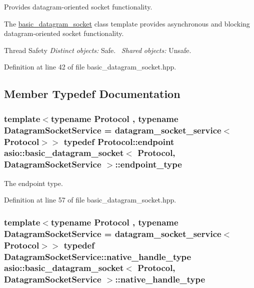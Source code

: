 Provides datagram-\/oriented socket functionality. 

The \hyperlink{classasio_1_1basic__datagram__socket}{basic\+\_\+datagram\+\_\+socket} class template provides asynchronous and blocking datagram-\/oriented socket functionality.

\begin{DoxyParagraph}{Thread Safety}
{\itshape Distinct} {\itshape objects\+:} Safe.~\newline
{\itshape Shared} {\itshape objects\+:} Unsafe. 
\end{DoxyParagraph}


Definition at line 42 of file basic\+\_\+datagram\+\_\+socket.\+hpp.



\subsection{Member Typedef Documentation}
\hypertarget{classasio_1_1basic__datagram__socket_af952c8d18c85588a16531cfc54a172bb}{}
\subsubsection[{endpoint\+\_\+type}]{\setlength{\rightskip}{0pt plus 5cm}template$<$typename Protocol , typename Datagram\+Socket\+Service  = datagram\+\_\+socket\+\_\+service$<$\+Protocol$>$$>$ typedef Protocol\+::endpoint {\bf asio\+::basic\+\_\+datagram\+\_\+socket}$<$ Protocol, Datagram\+Socket\+Service $>$\+::{\bf endpoint\+\_\+type}}\label{classasio_1_1basic__datagram__socket_af952c8d18c85588a16531cfc54a172bb}


The endpoint type. 



Definition at line 57 of file basic\+\_\+datagram\+\_\+socket.\+hpp.

\hypertarget{classasio_1_1basic__datagram__socket_a6e056acde4635471987bd2e39024d39c}{}
\subsubsection[{native\+\_\+handle\+\_\+type}]{\setlength{\rightskip}{0pt plus 5cm}template$<$typename Protocol , typename Datagram\+Socket\+Service  = datagram\+\_\+socket\+\_\+service$<$\+Protocol$>$$>$ typedef Datagram\+Socket\+Service\+::native\+\_\+handle\+\_\+type {\bf asio\+::basic\+\_\+datagram\+\_\+socket}$<$ Protocol, Datagram\+Socket\+Service $>$\+::{\bf native\+\_\+handle\+\_\+type}}\label{classasio_1_1basic__datagram__socket_a6e056acde4635471987bd2e39024d39c}


